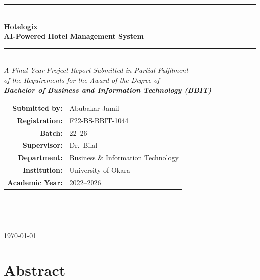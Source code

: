 \documentclass[12pt,a4paper]{report}
\begin{document}
\begin{titlepage}
\centering
\vspace*{1.5cm}
{\color{hotelblue}\rule{\linewidth}{2pt}}\\[0.4cm]
{\Huge\bfseries\color{hotelblue} Hotelogix\\[0.3cm]
\Large\bfseries\color{darkgray} AI-Powered Hotel Management System}\\[0.3cm]
{\color{hotelblue}\rule{\linewidth}{2pt}}\\[1cm]
{\large\itshape A Final Year Project Report Submitted in Partial Fulfilment\\
of the Requirements for the Award of the Degree of\\[0.4cm]
\textbf{Bachelor of Business and Information Technology (BBIT)}}\\[1.5cm]
\begin{tabular}{rl}
\textbf{Submitted by:}   & Abubakar Jamil              \\[4pt]
\textbf{Registration:}   & F22-BS-BBIT-1044            \\[4pt]
\textbf{Batch:}          & 22--26                      \\[4pt]
\textbf{Supervisor:}     & Dr.\ Bilal                  \\[4pt]
\textbf{Department:}     & Business \& Information Technology \\[4pt]
\textbf{Institution:}    & University of Okara         \\[4pt]
\textbf{Academic Year:}  & 2022--2026                  \\
\end{tabular}\\[2cm]
{\color{hotelblue}\rule{\linewidth}{1pt}}\\[0.3cm]
{\large\today}
\end{titlepage}

\tableofcontents
\newpage
\listoftables
\newpage

\chapter*{Abstract}
\end{document}
